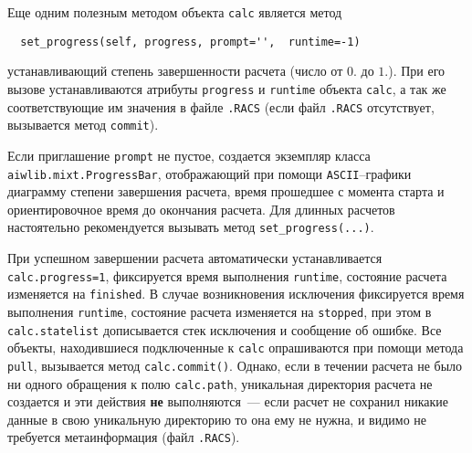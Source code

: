Еще одним полезным методом объекта \verb'calc' является метод
\begin{verbatim}
  set_progress(self, progress, prompt='',  runtime=-1)
\end{verbatim}
устанавливающий степень завершенности расчета (число от $0.$ до $1.$). При его вызове 
устанавливаются атрибуты \verb'progress' и \verb'runtime' объекта \verb'calc', 
а так же соответствующие им значения в файле \verb'.RACS' (если файл \verb'.RACS' отсутствует, вызывается метод \verb'commit').

Если приглашение \verb'prompt' не пустое, создается экземпляр класса \verb'aiwlib.mixt.ProgressBar',
отображающий при помощи \verb'ASCII'--графики диаграмму степени завершения расчета, время прошедшее с момента старта и
ориентировочное время до окончания расчета. Для длинных расчетов настоятельно рекомендуется вызывать метод \verb'set_progress(...)'.

При успешном завершении расчета  автоматически устанавливается \verb'calc.progress=1', фиксируется время выполнения \verb'runtime',
состояние расчета изменяется на \verb'finished'. В случае возникновения исключения
фиксируется время выполнения \verb'runtime',
состояние расчета изменяется на \verb'stopped', при этом в \verb'calc.statelist' дописывается стек исключения и сообщение об ошибке.
Все объекты, находившиеся подключенные к \verb'calc' опрашиваются при помощи метода \verb'pull', вызывается метод \verb'calc.commit()'.
Однако, если в течении расчета не было ни одного обращения к полю \verb'calc.path',
уникальная директория расчета не создается и эти действия {\bf не} выполняются~--- если расчет не сохранил никакие данные в
свою уникальную директорию то она ему не нужна, и видимо не требуется метаинформация (файл \verb'.RACS'). 

